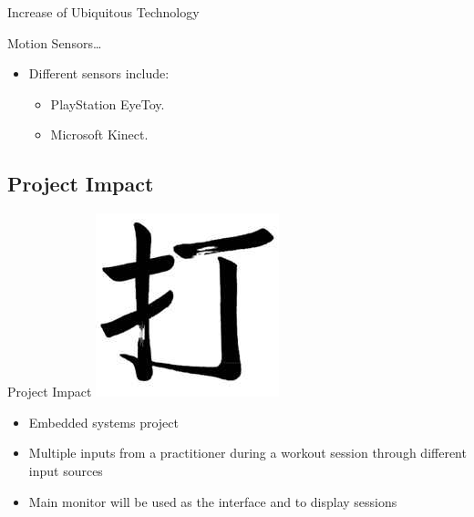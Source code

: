 \documentclass{beamer}
\begin{document}
\begin{frame}{Increase of Ubiquitous Technology}

  Motion Sensors\dots
  \begin{itemize}
  \item Different sensors include:
    \begin{itemize}
    \pause    
    \item
      PlayStation EyeToy.
    \pause
    \item    
      Microsoft Kinect.
    \pause
    \end{itemize}
  \end{itemize}
\end{frame}

\subsection{Project Impact}

 \begin{frame}{Project Impact}
\includegraphics[scale=0.2]{Da.png}  
\begin{itemize}
   \item
    Embedded systems project
   \item
    Multiple inputs from a practitioner during a workout session through different input sources
   \item
    Main monitor will be used as the interface and to display sessions
  \end{itemize}
 \end{frame}
\end{document}
